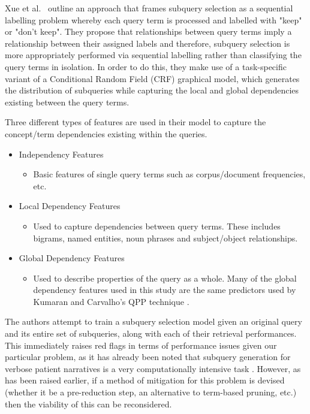 \documentclass[a4paper]{report}
\begin{document}
Xue et al.~\cite{Xue:2010:IVQ:1871437.1871572} outline an approach that frames subquery selection as a sequential labelling problem whereby each query term is processed and labelled with "keep" or "don't keep".  They propose that relationships between query terms imply a relationship between their assigned labels and therefore, subquery selection is more appropriately performed via sequential labelling rather than classifying the query terms in isolation. In order to do this, they make use of a task-specific variant of a Conditional Random Field (CRF) graphical model, which generates the distribution of subqueries while capturing the local and global dependencies existing between the query terms.

Three different types of features are used in their model to capture the concept/term dependencies existing within the queries. 

\begin{itemize}
  \item Independency Features
    \begin{itemize}
      \item Basic features of single query terms such as corpus/document frequencies, etc.
    \end{itemize}
  \item Local Dependency Features
    \begin{itemize}
      \item Used to capture dependencies between query terms. These includes bigrams, named entities, noun phrases and subject/object relationships.
    \end{itemize}
  \item Global Dependency Features
    \begin{itemize}
      \item Used to describe properties of the query as a whole. Many of the global dependency features used in this study are the same predictors used by Kumaran and Carvalho's QPP technique \cite{Kumaran2009Reducing-Long-Q}. 
    \end{itemize}
\end{itemize}

The authors attempt to train a subquery selection model given an original query and its entire set of subqueries, along with each of their retrieval performances. This immediately raises red flags in terms of performance issues given our particular problem, as it has already been noted that subquery generation for verbose patient narratives is a very computationally intensive task \citep{koopman2017generating}. However, as has been raised earlier, if a method of mitigation for this problem is devised (whether it be a pre-reduction step, an alternative to term-based pruning, etc.) then the viability of this can be reconsidered.
\end{document}
